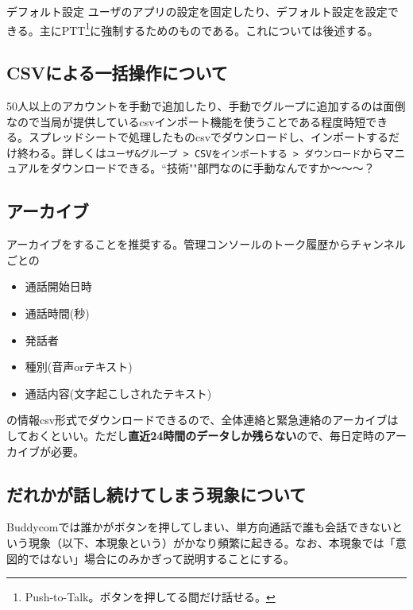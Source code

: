 \documentclass[dvipdfmx,jb5]{jreport}
\newcommand{\impact}[1]{\textbf{\gtfamily #1}}
\newcommand{\terlogy}[2][|]{\colorbox{terlogy}{\texttt{\lstinline#1#2#1}}}
\begin{document}
{デフォルト設定}
ユーザのアプリの設定を固定したり、デフォルト設定を設定できる。主にPTT\footnote{Push-to-Talk。ボタンを押してる間だけ話せる。}に強制するためのものである。これについては後述する。


\subsection{CSVによる一括操作について}
50人以上のアカウントを手動で追加したり、手動でグループに追加するのは面倒なので当局が提供しているcsvインポート機能を使うことである程度時短できる。スプレッドシートで処理したものcsvでダウンロードし、インポートするだけ終わる。詳しくは\terlogy{ユーザ&グループ > CSVをインポートする > ダウンロード}からマニュアルをダウンロードできる。``技術""部門なのに手動なんですか〜〜〜？

\subsection{アーカイブ}
アーカイブをすることを推奨する。管理コンソールのトーク履歴からチャンネルごとの
\begin{itemize}
      \item 通話開始日時
      \item 通話時間(秒)
      \item 発話者
      \item 種別(音声orテキスト)
      \item 通話内容(文字起こしされたテキスト)
\end{itemize}
の情報csv形式でダウンロードできるので、全体連絡と緊急連絡のアーカイブはしておくといい。ただし\impact{直近24時間のデータしか残らない}ので、毎日定時のアーカイブが必要。

\subsection{だれかが話し続けてしまう現象について}
Buddycomでは誰かがボタンを押してしまい、単方向通話で誰も会話できないという現象（以下、本現象という）がかなり頻繁に起きる。なお、本現象では「意図的ではない」場合にのみかぎって説明することにする。
\end{document}
